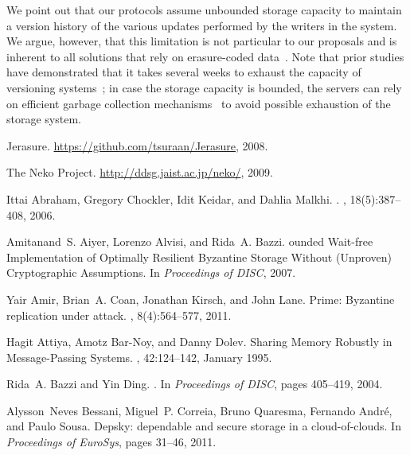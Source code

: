 \documentclass[10pt,conference,compsocconf]{IEEEtran}
\begin{document}
We point out that our protocols assume unbounded storage capacity to maintain a version history of
the various updates performed by the writers in the system. We argue, however, that this limitation is not particular to our proposals and is inherent to all
solutions that rely on erasure-coded data~\cite{Soules2003}. Note that prior studies have demonstrated that it takes several weeks to exhaust the capacity of versioning systems~\cite{Strunk2000}; in case the storage capacity is bounded, the servers can rely on efficient garbage collection mechanisms~\cite{GWGR04} to avoid possible exhaustion of the storage system.




\begin{thebibliography}{10}

{{Jerasure}}.
\newblock \url{https://github.com/tsuraan/Jerasure}, 2008.

{{The Neko Project}}.
\newblock \url{http://ddsg.jaist.ac.jp/neko/}, 2009.

Ittai Abraham, Gregory Chockler, Idit Keidar, and Dahlia Malkhi.
.
, 18(5):387--408, 2006.

Amitanand~S. Aiyer, Lorenzo Alvisi, and Rida~A. Bazzi.
ounded {W}ait-free {I}mplementation of {O}ptimally {R}esilient
  {B}yzantine {S}torage {W}ithout ({U}nproven) {C}ryptographic {A}ssumptions.
\newblock In {\em Proceedings of DISC}, 2007.

Yair Amir, Brian~A. Coan, Jonathan Kirsch, and John Lane.
\newblock Prime: {B}yzantine replication under attack.
, 8(4):564--577, 2011.

Hagit Attiya, Amotz Bar-Noy, and Danny Dolev.
\newblock Sharing {M}emory {R}obustly in {M}essage-{P}assing {S}ystems.
, 42:124--142, January 1995.

Rida~A. Bazzi and Yin Ding.
.
\newblock In {\em Proceedings of DISC}, pages 405--419, 2004.

Alysson~Neves Bessani, Miguel~P. Correia, Bruno Quaresma, Fernando Andr{\'e},
  and Paulo Sousa.
\newblock Depsky: dependable and secure storage in a cloud-of-clouds.
\newblock In {\em Proceedings of EuroSys}, pages 31--46, 2011.


\end{thebibliography}
\end{document}
